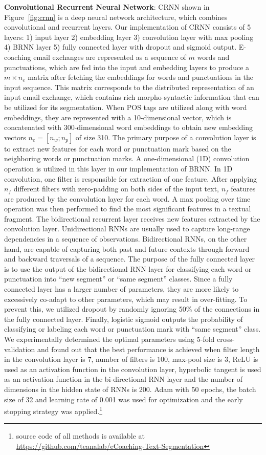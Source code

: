 \documentclass{amia}
\begin{document}
\textbf{Convolutional Recurrent Neural Network}: CRNN \cite{treviso2017sentence} shown in Figure~\ref{fig:crnn} is a deep neural network architecture, which combines convolutional and recurrent layers. Our implementation of CRNN consists of 5 layers: 1) input layer 2) embedding layer 3) convolution layer with max pooling 4) BRNN layer 5) fully connected layer with dropout and sigmoid output. E-coaching email exchanges are represented as a sequence of $m$ words and punctuations, which are fed into the input and embedding layers to produce a $m \times n_e$ matrix after fetching the embeddings for words and punctuations in the input sequence. This matrix corresponds to the distributed representation of an input email exchange, which contains rich morpho-syntactic information that can be utilized for its segmentation. When POS tags are utilized along with word embeddings, they are represented with a 10-dimensional vector, which is concatenated with 300-dimensional word embeddings to obtain new embedding vectors $n_e = [n_w;n_p]$ of size 310. The primary purpose of a convolution layer is to extract new features for each word or punctuation mark based on the neighboring words or punctuation marks. A one-dimensional (1D) convolution operation is utilized in this layer in our implementation of BRNN. In 1D convolution, one filter is responsible for extraction of one feature. After applying $n_f$ different filters with zero-padding on both sides of the input text, $n_f$ features are produced by the convolution layer for each word. A max pooling over time operation was then performed to find the most significant features in a textual fragment. The bidirectional recurrent layer receives new features extracted by the convolution layer. Unidirectional RNNs are usually used to capture long-range dependencies in a sequence of observations. Bidirectional RNNs, on the other hand, are capable of capturing both past and future contexts through forward and backward traversals of a sequence. The purpose of the fully connected layer is to use the output of the bidirectional RNN layer for classifying each word or punctuation into ``new segment'' or ``same segment'' classes. Since a fully connected layer has a larger number of parameters, they are more likely to excessively co-adapt to  other parameters, which may result in over-fitting. To prevent this, we utilized dropout by randomly ignoring 50\% of the connections in the fully connected layer. Finally, logistic sigmoid outputs the probability of classifying or labeling each word or punctuation mark with ``same segment'' class. We experimentally determined the optimal parameters using 5-fold cross-validation and found out that the best performance is achieved when filter length in the convolution layer is 7, number of filters is 100, max-pool size is 3, ReLU is used as an activation function in the convolution layer, hyperbolic tangent is used as an activation function in the bi-directional RNN layer and the number of dimensions in the hidden state of RNNs is 200. Adam\cite{kingma2014adam} with 50 epochs, the batch size of 32 and learning rate of 0.001 was used for optimization and the early stopping strategy was applied.\footnote{source code of all methods is available at \url{https://github.com/teanalab/eCoaching-Text-Segmentation}}
\end{document}
